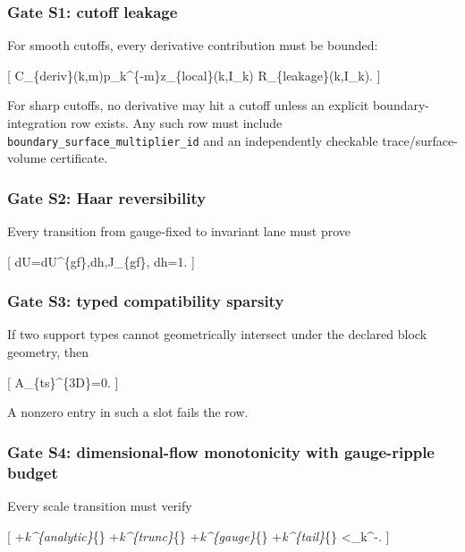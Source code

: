 \documentclass[
]{article}
\begin{document}
\subsubsection{Gate S1: cutoff leakage}\label{gate-s1-cutoff-leakage}

For smooth cutoffs, every derivative contribution must be bounded:

{[} C\_\{\rm deriv\}(k,m)p\_k\^{}\{-m\}z\_\{\rm local\}(k,I\_k)
\le R\_\{\rm leakage\}(k,I\_k). {]}

For sharp cutoffs, no derivative may hit a cutoff unless an explicit
boundary-integration row exists. Any such row must include
\texttt{boundary\_surface\_multiplier\_id} and an independently
checkable trace/surface-volume certificate.

\subsubsection{Gate S2: Haar
reversibility}\label{gate-s2-haar-reversibility}

Every transition from gauge-fixed to invariant lane must prove

{[} dU=dU\^{}\{\rm gf\},dh,J\_\{\rm gf\}, \qquad \int dh=1. {]}

\subsubsection{Gate S3: typed compatibility
sparsity}\label{gate-s3-typed-compatibility-sparsity}

If two support types cannot geometrically intersect under the declared
block geometry, then

{[} A\_\{ts\}\^{}\{3D\}=0. {]}

A nonzero entry in such a slot fails the row.

\subsubsection{Gate S4: dimensional-flow monotonicity with gauge-ripple
budget}\label{gate-s4-dimensional-flow-monotonicity-with-gauge-ripple-budget}

Every scale transition must verify

{[} 
+\textbar{}\Delta\emph{k\^{}\{\rm analytic\}\textbar{}}\{\max\}
+\textbar{}\Delta\emph{k\^{}\{\rm trunc\}\textbar{}}\{\max\}
+\textbar{}\Delta\emph{k\^{}\{\rm gauge\}\textbar{}}\{\max\}
+\textbar{}\Delta\emph{k\^{}\{\rm tail\}\textbar{}}\{\max\}
\textless{}\beta\_k\^{}-. {]}
\end{document}
